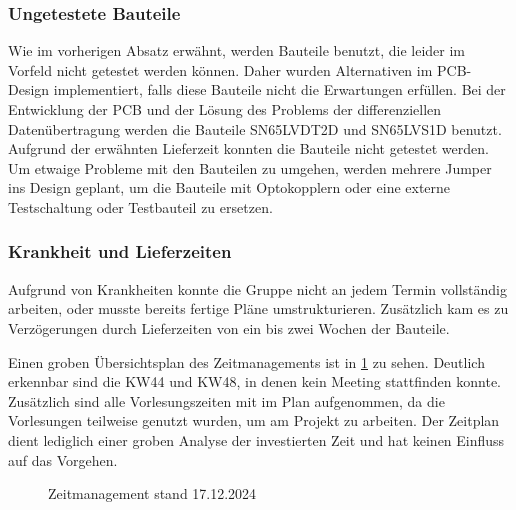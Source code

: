 \subsubsection{Ungetestete Bauteile}
Wie im vorherigen Absatz erwähnt, werden Bauteile benutzt, die leider im Vorfeld nicht getestet werden können. Daher wurden Alternativen im PCB-Design implementiert, falls diese Bauteile nicht die Erwartungen erfüllen. Bei der Entwicklung der PCB und der Lösung des Problems der differenziellen Datenübertragung werden die Bauteile SN65LVDT2D und SN65LVS1D benutzt. Aufgrund der erwähnten Lieferzeit konnten die Bauteile nicht getestet werden. Um etwaige Probleme mit den Bauteilen zu umgehen, werden mehrere Jumper ins Design geplant, um die Bauteile mit Optokopplern oder eine externe Testschaltung oder Testbauteil zu ersetzen.

\subsubsection{Krankheit und Lieferzeiten}
Aufgrund von Krankheiten konnte die Gruppe nicht an jedem Termin vollständig arbeiten, oder musste bereits fertige Pläne umstrukturieren. Zusätzlich kam es zu Verzögerungen durch Lieferzeiten von ein bis zwei Wochen der Bauteile.


Einen groben Übersichtsplan des Zeitmanagements ist in \ref{zeitplan} zu sehen. Deutlich erkennbar sind die KW44 und KW48, in denen kein Meeting stattfinden konnte. Zusätzlich sind alle Vorlesungszeiten mit im Plan aufgenommen, da die Vorlesungen teilweise genutzt wurden, um am Projekt zu arbeiten. Der Zeitplan dient lediglich einer groben Analyse der investierten Zeit und hat keinen Einfluss auf das Vorgehen.

\begin{figure}[H]
    \centering    
    \caption{Zeitmanagement stand 17.12.2024}
    \label{zeitplan}
\end{figure}


